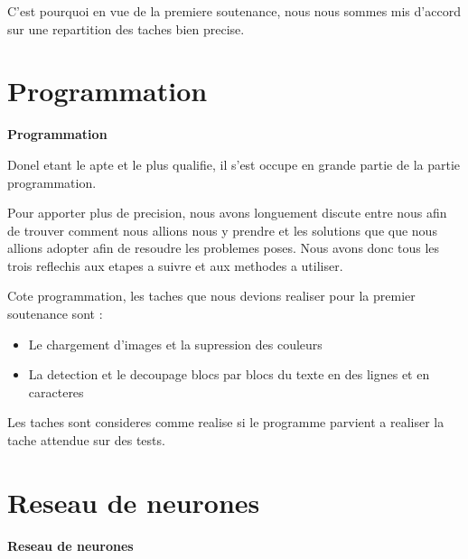 \documentclass[a4paper, 12pt]{report}
\begin{document}
	
	C'est pourquoi en vue de la premiere soutenance, nous nous sommes mis d'accord sur une repartition des taches bien precise.\\ \newpage 	
	
	\chapter{Programmation} 
	
	\newpage 	
	
	\huge {\bfseries Programmation } \\
	
	\Large
	
	Donel etant le apte et le plus qualifie, il s'est occupe en grande partie de la partie programmation. \newline
	
	Pour apporter plus de precision, nous avons longuement discute entre nous afin de trouver comment nous allions nous y prendre et les solutions que que nous allions adopter afin de resoudre les problemes poses. Nous avons donc tous les trois reflechis aux etapes a suivre et aux methodes a utiliser.\newline
	
	
	Cote programmation, les taches que nous devions realiser pour la premier soutenance sont : 
	
	\begin{itemize}


\item Le chargement d'images et la supression des couleurs

\item La detection et le decoupage blocs par blocs du texte en des lignes et en caracteres \\ \newline


\end{itemize}

Les taches sont consideres comme realise si le programme parvient a realiser la tache attendue sur des tests. \newpage
	
	
	
	
	\chapter{Reseau de neurones} 
	
	\newpage 	
	
	\huge {\bfseries Reseau de neurones } \\
	
\end{document}
